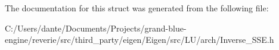 The documentation for this struct was generated from the following file\+:\begin{DoxyCompactItemize}
\item 
C\+:/\+Users/dante/\+Documents/\+Projects/grand-\/blue-\/engine/reverie/src/third\+\_\+party/eigen/\+Eigen/src/\+L\+U/arch/Inverse\+\_\+\+S\+S\+E.\+h\end{DoxyCompactItemize}
